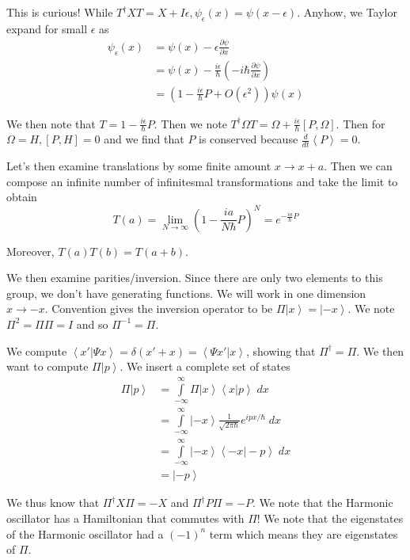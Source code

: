 \documentclass[10pt]{report}
\newcommand{\ket}[1]{\left|#1\right>}
\newcommand{\dotp}[2]{\left<#1\left.\right|#2\right>}
\newcommand{\rd}[2]{\frac{d#1}{d#2}}
\newcommand{\pd}[2]{\frac{\partial #1}{\partial#2}}
\newcommand{\expvalue}[1]{\left<#1\right>}
\begin{document}
This is curious! While $T^\dagger X T = X + I\epsilon, \psi_\epsilon(x) = \psi(x-\epsilon)$. Anyhow, we Taylor expand for small $\epsilon$ as 
\begin{align}
	\psi_\epsilon(x) &= \psi(x) - \epsilon \pd{\psi}{x}\\
	&= \psi(x) - \frac{i\epsilon}{\hbar}\left( -i\hbar\pd{\psi}{x} \right)\\
	&= \left(1-\frac{i\epsilon}{\hbar}P + O(\epsilon^2)\right) \psi(x)
\end{align}

We then note that $T = 1-\frac{i\epsilon}{\hbar}P$. Then we note $T^\dagger  \Omega T = \Omega + \frac{i\epsilon}{\hbar}\left[ P,\Omega \right]$. Then for $\Omega = H, \left[ P,H \right] = 0$ and we find that $P$ is conserved because $\rd{}{t}\expvalue{P} = 0$.

Let's then examine translations by some finite amount $x \to x + a$. Then we can compose an infinite number of infinitesmal transformations and take the limit to obtain
$$T(a) = \lim_{N \to \infty}\left( 1-\frac{ia}{N\hbar}P \right)^N = e^{-\frac{ia}{\hbar}P}$$

Moreover, $T(a)T(b) = T(a+b)$. 

We then examine parities/inversion. Since there are only two elements to this group, we don't have generating functions. We will work in one dimension $x \to -x$. Convention gives the inversion operator to be $\Pi \ket{x} = \ket{-x}$. We note $\Pi^2 = \Pi \Pi = I$ and so $\Pi^{-1} = \Pi$. 

We compute $\dotp{x'}{\Psi x} = \delta(x'+x) = \dotp{\Psi x'}{x}$, showing that $\Pi^\dagger = \Pi$. We then want to compute $\Pi \ket{p}$. We insert a complete set of states 
\begin{align}
	\Pi \ket{p} &= \displaystyle\int\limits_{-\infty}^{\infty}\Pi\ket{x}\dotp{x}{p}\;dx\\
	&= \displaystyle\int\limits_{-\infty}^{\infty}\ket{-x}\frac{1}{\sqrt{2\pi\hbar}}e^{ipx/\hbar}\;dx\\
	&= \displaystyle\int\limits_{-\infty}^{\infty}\ket{-x}\dotp{-x}{-p}\;dx\\
	&= \ket{-p}
\end{align}

We thus know that $\Pi^\dagger X \Pi = -X$ and $\Pi^\dagger P \Pi = -P$. We note that the Harmonic oscillator has a Hamiltonian that commutes with $\Pi$! We note that the eigenstates of the Harmonic oscillator had a $(-1)^n$ term which means they are eigenstates of $\Pi$. 
\end{document}
